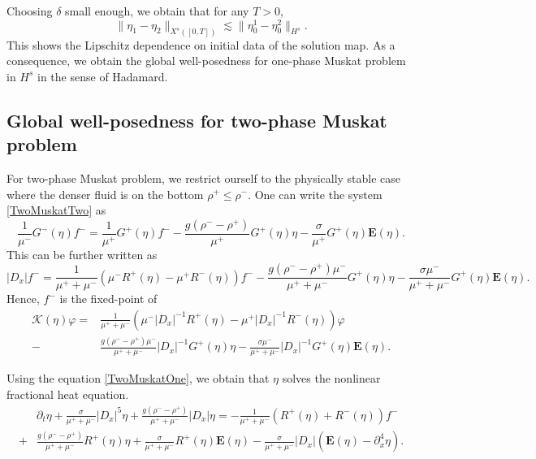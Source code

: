 \documentclass[12pt]{amsart}
\theoremstyle{definition}
\numberwithin{equation}{section}
\newcommand{\p}{\partial}
\newcommand{\f}{\frac}
\begin{document}
Choosing $\delta$ small enough, we obtain that for any $T>0$,
\begin{equation*}
 \|\eta_1 - \eta_2\|_{X^s([0,T])} \lesssim \|\eta_0^1 - \eta_0^2 \|_{H^s}.
\end{equation*}
This shows the Lipschitz dependence on initial data of the solution map.
As a consequence, we obtain the global well-posedness for one-phase Muskat problem in $H^s$ in the sense of Hadamard.


\subsection{Global well-posedness for two-phase Muskat problem} \label{s:GlobalTwoMuskat}
For two-phase Muskat problem, we restrict ourself to the physically stable case where the denser fluid is on the bottom $\rho^+\leq \rho^-$.
One can write the system \eqref{TwoMuskatTwo} as 
\begin{equation*}
 \frac{1}{\mu^-}G^-(\eta)f^- = \frac{1}{\mu^+}G^+(\eta)f^- -\frac{g(\rho^- - \rho^+)}{\mu^+}G^+(\eta)\eta - \f{\sigma}{\mu^+}G^+(\eta) \mathbf{E}(\eta).
\end{equation*}
This can be further written as
\begin{equation*}
|D_x|f^- = \f{1}{\mu^+ + \mu^-}(\mu^- R^+(\eta)-\mu^+ R^-(\eta))f^-  -\f{g(\rho^- - \rho^+)\mu^-}{\mu^+ + \mu^-}G^+ (\eta) \eta -\f{\sigma \mu^-}{\mu^+ + \mu^-}G^+ (\eta) \mathbf{E}(\eta).
\end{equation*}
Hence, $f^-$ is the fixed-point of 
\begin{equation*} %
\begin{aligned}
\mathcal{K}(\eta)\varphi = &\f{1}{\mu^+ + \mu^-}(\mu^- |D_x|^{-1}R^+(\eta)-\mu^+ |D_x|^{-1}R^-(\eta))\varphi \\
-&\f{g(\rho^- - \rho^+)\mu^-}{\mu^+ + \mu^-}|D_x|^{-1}G^+ (\eta) \eta -\f{\sigma \mu^-}{\mu^+ + \mu^-}|D_x|^{-1}G^+ (\eta) \mathbf{E}(\eta). 
\end{aligned}
\end{equation*}

Using the equation \eqref{TwoMuskatOne}, we obtain that $\eta$ solves the nonlinear fractional heat equation.
\begin{equation*}  %
\begin{aligned}
 &\p_t \eta + \frac{\sigma}{\mu^+ + \mu^-}|D_x|^5 \eta + \frac{g(\rho^- - \rho^+)}{\mu^+ + \mu^-}|D_x|\eta = -\frac{1}{\mu^+ + \mu^-}( R^+(\eta)+ R^-(\eta))f^- \\
 +& \frac{g(\rho^- - \rho^+)}{\mu^+ + \mu^-}R^+(\eta)\eta + \f{\sigma}{\mu^++\mu^-}R^+(\eta) \mathbf{E}(\eta) - \f{\sigma}{\mu^++\mu^-}|D_x|( \mathbf{E}(\eta) - \p_x^4\eta).
\end{aligned}
\end{equation*}
\end{document}
